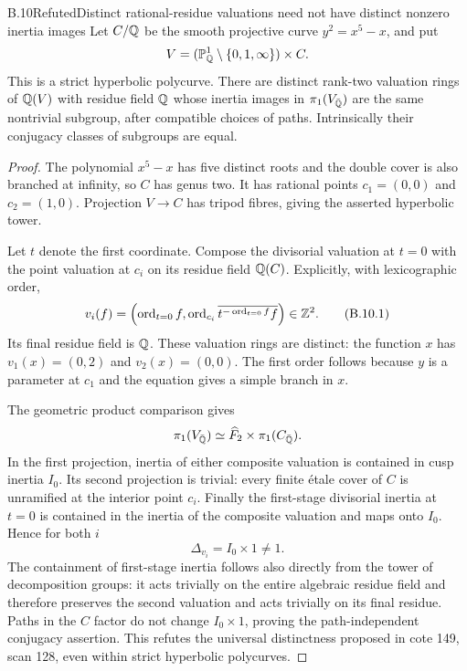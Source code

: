 \begin{statement}{B.10}{Refuted}{Distinct rational-residue valuations need not have distinct nonzero inertia images}
Let $C/\mathbb Q$ be the smooth projective curve $y^2=x^5-x$, and put
\[
 V=(\mathbb P^1_\mathbb Q\setminus\{0,1,\infty\})\times C.
\]
This is a strict hyperbolic polycurve.  There are distinct rank-two
valuation rings of $\mathbb Q(V)$ with residue field $\mathbb Q$ whose inertia
images in $\pi_1(V_{\bar{\mathbb Q}})$ are the same nontrivial subgroup,
after compatible choices of paths.  Intrinsically their conjugacy
classes of subgroups are equal.
\end{statement}
\begin{proof}
The polynomial $x^5-x$ has five distinct roots and the double cover
is also branched at infinity, so $C$ has genus two.  It has rational
points $c_1=(0,0)$ and $c_2=(1,0)$.  Projection $V\to C$ has
tripod fibres, giving the asserted hyperbolic tower.

Let $t$ denote the first coordinate.  Compose the divisorial
valuation at $t=0$ with the point valuation at $c_i$ on its residue
field $\mathbb Q(C)$.  Explicitly, with lexicographic order,
\[
 v_i(f)=\left(\operatorname{ord}_{t=0}f,
       \operatorname{ord}_{c_i}
       \overline{t^{-\operatorname{ord}_{t=0}f}f}\right)
       \in\mathbb Z^2.                                  \tag{B.10.1}
\]
Its final residue field is $\mathbb Q$.  These valuation rings are distinct:
the function $x$ has $v_1(x)=(0,2)$ and $v_2(x)=(0,0)$.
The first order follows because $y$ is a parameter at $c_1$ and
the equation gives a simple branch in $x$.

The geometric product comparison gives
\[
 \pi_1(V_{\bar{\mathbb Q}})\simeq
       \widehat F_2\times\pi_1(C_{\bar{\mathbb Q}}).
\]
In the first projection, inertia of either composite valuation
is contained in cusp inertia $I_0$.  Its second projection is
trivial: every finite \'etale cover of $C$ is unramified at the
interior point $c_i$.  Finally the first-stage divisorial inertia
at $t=0$ is contained in the inertia of the composite valuation
and maps onto $I_0$.  Hence for both $i$
\[
                   \Delta_{v_i}=I_0\times1\ne1.   \tag{B.10.2}
\]
The containment of first-stage inertia follows also directly from
the tower of decomposition groups: it acts trivially on the entire
algebraic residue field and therefore preserves the second valuation
and acts trivially on its final residue.  Paths in the $C$ factor
do not change $I_0\times1$, proving the path-independent conjugacy
assertion.  This refutes the universal distinctness proposed in
cote 149, scan 128, even within strict hyperbolic polycurves.
\end{proof}

